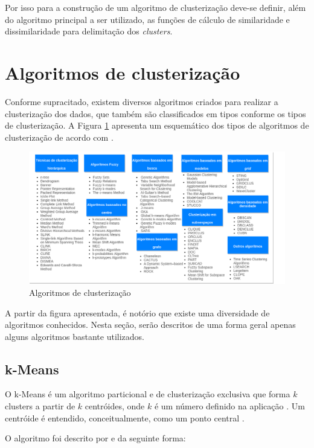Por isso para a construção de um algoritmo de clusterização deve-se definir, além do algoritmo principal a ser utilizado, as funções
de cálculo de similaridade e dissimilaridade para delimitação dos \textit{clusters}.

\section{Algoritmos de clusterização}
Conforme supracitado, existem diversos algoritmos criados para realizar a clusterização dos dados, que também são classificados em tipos
conforme os tipos de clusterização. A Figura \ref{fig:tipos_algoritmo} apresenta um esquemático dos tipos de algoritmos de clusterização de acordo
com .

\begin{figure}[h!]
\centering
\includegraphics[scale=0.5]{figuras/algoritmos.png}
\caption{Algoritmos de clusterização}
\label{fig:tipos_algoritmo}
\end{figure}

A partir da figura apresentada, é notório que existe uma diversidade de algoritmos conhecidos. Nesta seção, serão descritos
de uma forma geral apenas alguns algoritmos bastante utilizados.

\subsection{k-Means}
O k-Means é um algoritmo particional e de clusterização exclusiva que forma $k$ clusters a partir de $k$ centróides, onde $k$ é um número definido na aplicação 
\cite{clustering_review, tan2013data}. Um centróide é entendido, conceitualmente, como um ponto central \cite{han2011data}.

O algoritmo foi descrito por  e  da seguinte forma:


